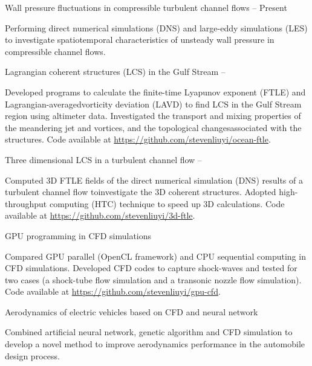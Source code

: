 \documentclass[letterpaper,MMMyyyy,nonstopmode]{simpleresumecv}
\begin{document}
\begin{Body}
    \Entry
    Wall pressure fluctuations in compressible turbulent channel flows
    \hfill
     -- Present
    \begin{Detail}
        \BulletItem
        Performing direct numerical simulations (DNS) and large-eddy simulations (LES) to investigate spatiotemporal characteristics of unsteady wall pressure in compressible channel flows.
    \end{Detail}
    \Entry
    Lagrangian coherent structures (LCS) in the Gulf Stream
    \hfill
     -- 
    \begin{Detail}
        \BulletItem
        Developed programs to calculate the finite-time Lyapunov exponent (FTLE) and Lagrangian-averagedvorticity deviation (LAVD) to find LCS in the Gulf Stream region using altimeter data.
        \BulletItem
        Investigated the transport and mixing properties of the meandering jet and vortices, and the topological changesassociated with the structures.
        \BulletItem
        Code available at \href{https://github.com/stevenliuyi/ocean-ftle}{https://github.com/stevenliuyi/ocean-ftle}.
    \end{Detail}
    \Entry
    Three dimensional LCS in a turbulent channel flow
    \hfill
     – 
    \begin{Detail}
        \BulletItem
        Computed 3D FTLE fields of the direct numerical simulation (DNS) results of a turbulent channel flow toinvestigate the 3D coherent structures.
        \BulletItem
        Adopted high-throughput computing (HTC) technique to speed up 3D calculations.
        \BulletItem
        Code available at \href{https://github.com/stevenliuyi/3d-ftle}{https://github.com/stevenliuyi/3d-ftle}.
    \end{Detail}
    \Entry
    GPU programming in CFD simulations
    \hfill
    \begin{Detail}
        \BulletItem
        Compared GPU parallel (OpenCL framework) and CPU sequential computing in CFD simulations.
        \BulletItem
        Developed CFD codes to capture shock-waves and tested for two cases (a shock-tube flow simulation and a transonic nozzle flow simulation).
        \BulletItem
        Code available at \href{https://github.com/stevenliuyi/gpu-cfd}{https://github.com/stevenliuyi/gpu-cfd}.
    \end{Detail}
    \Entry
    Aerodynamics of electric vehicles based on CFD and neural network
    \hfill
    \begin{Detail}
        \BulletItem
        Combined artificial neural network, genetic algorithm and CFD simulation to develop a novel method to improve aerodynamics performance in the automobile design process.
    \end{Detail}


\end{Body}
\end{document}
